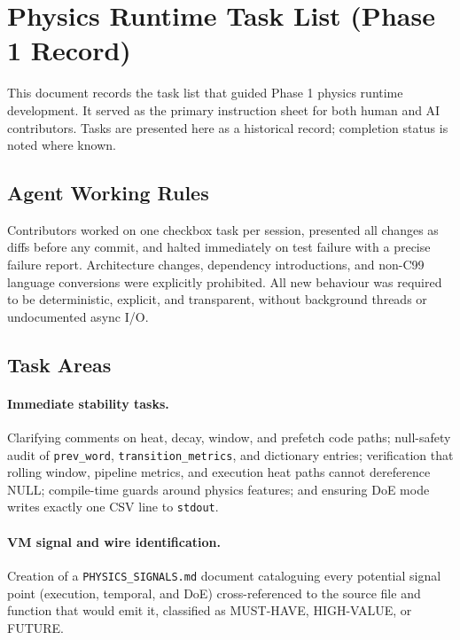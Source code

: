 
\section{Physics Runtime Task List (Phase 1 Record)}

This document records the task list that guided Phase 1 physics runtime development.
It served as the primary instruction sheet for both human and AI contributors. Tasks
are presented here as a historical record; completion status is noted where known.

\subsection{Agent Working Rules}

Contributors worked on one checkbox task per session, presented all changes as diffs
before any commit, and halted immediately on test failure with a precise failure report.
Architecture changes, dependency introductions, and non-C99 language conversions were
explicitly prohibited. All new behaviour was required to be deterministic, explicit, and
transparent, without background threads or undocumented async I/O.

\subsection{Task Areas}

\paragraph{Immediate stability tasks.}
Clarifying comments on heat, decay, window, and prefetch code paths; null-safety audit
of \texttt{prev\_word}, \texttt{transition\_metrics}, and dictionary entries; verification
that rolling window, pipeline metrics, and execution heat paths cannot dereference NULL;
compile-time guards around physics features; and ensuring DoE mode writes exactly one
CSV line to \texttt{stdout}.

\paragraph{VM signal and wire identification.}
Creation of a \texttt{PHYSICS\_SIGNALS.md} document cataloguing every potential signal
point (execution, temporal, and DoE) cross-referenced to the source file and function
that would emit it, classified as MUST-HAVE, HIGH-VALUE, or FUTURE.

